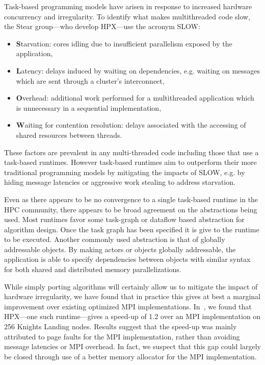 Task-based programming models have arisen in response to increased hardware concurrency and irregularity. To identify what makes multithreaded code slow, the Ste{\textbar}{\textbar}ar group---who develop HPX---use the acronym SLOW:
\begin{itemize}
\item {\bf S}tarvation: cores idling due to insufficient parallelism exposed by the application,                                                                           
                                                                                      
\item {\bf L}atency: delays induced by waiting on dependencies, e.g. waiting on messages which are sent through a cluster's interconnect,                                  
                                                                                      
\item {\bf O}verhead: additional work performed for a multithreaded application which is unnecessary in a sequential implementation,                                       
                                                                                      
\item {\bf W}aiting for contention resolution: delays associated with the accessing of shared resources between threads.                                                   
\end{itemize}
These factors are prevalent in any multi-threaded code including those that use a task-based runtimes. However task-based runtimes aim to outperform their more traditional programming models by mitigating the impacts of SLOW, e.g. by hiding message latencies or aggressive work stealing to address starvation.

Even as there appears to be no convergence to a single task-based runtime in the HPC community, there appears to be broad agreement on the abstractions being used. Most runtimes favor some task-graph or dataflow based abstraction for algorithm design. Once the task graph has been specified it is give to the runtime to be executed. Another commonly used abstraction is that of globally addressable objects. By making actors or objects globally addressable, the application is able to specify dependencies between objects with similar syntax for both shared and distributed memory parallelizations.

While simply porting algorithms will certainly allow us to mitigate the impact of hardware irregularity, we have found that in practice this gives at best a marginal improvement over existing optimized MPI implementations. 
In~\cite{Bremer2019}, we found that HPX---one such runtime---gives a speed-up of 1.2 over an MPI implementation on 256 Knights Landing nodes. Results suggest that the speed-up was mainly attributed to page faults for the MPI implementation, rather than avoiding message latencies or MPI overhead. In fact, we suspect that this gap could largely be closed through use of a better memory allocator for the MPI implementation. 


